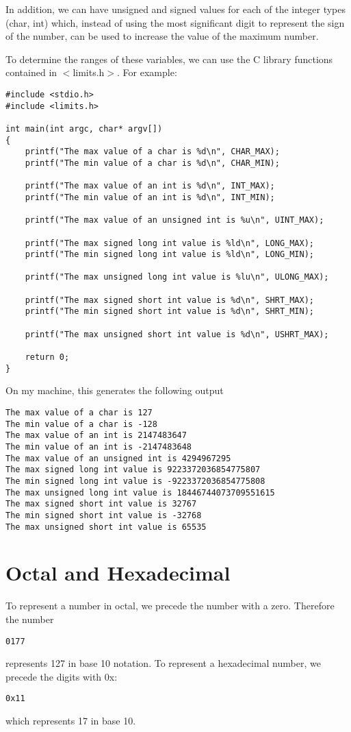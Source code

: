 In addition, we can have unsigned and signed values for each of the integer types (char, int) which, instead of using the most significant digit to represent the sign of the number, can be used to increase the value of the maximum number. 

To determine the ranges of these variables, we can use the C library functions contained in $<$limits.h$>$. For example:
\begin{verbatim}
#include <stdio.h>
#include <limits.h>

int main(int argc, char* argv[])
{
	printf("The max value of a char is %d\n", CHAR_MAX);
	printf("The min value of a char is %d\n", CHAR_MIN);
	
	printf("The max value of an int is %d\n", INT_MAX);
	printf("The min value of an int is %d\n", INT_MIN);
	
	printf("The max value of an unsigned int is %u\n", UINT_MAX);
	
	printf("The max signed long int value is %ld\n", LONG_MAX);
	printf("The min signed long int value is %ld\n", LONG_MIN);
	
	printf("The max unsigned long int value is %lu\n", ULONG_MAX);
	
	printf("The max signed short int value is %d\n", SHRT_MAX);
	printf("The min signed short int value is %d\n", SHRT_MIN);
	
	printf("The max unsigned short int value is %d\n", USHRT_MAX);
	
	return 0;
}
\end{verbatim}

On my machine, this generates the following output
\begin{verbatim}
The max value of a char is 127
The min value of a char is -128
The max value of an int is 2147483647
The min value of an int is -2147483648
The max value of an unsigned int is 4294967295
The max signed long int value is 9223372036854775807
The min signed long int value is -9223372036854775808
The max unsigned long int value is 18446744073709551615
The max signed short int value is 32767
The min signed short int value is -32768
The max unsigned short int value is 65535
\end{verbatim}



\section{Octal and Hexadecimal}

To represent a number in octal, we precede the number with a zero. Therefore the number 
\begin{verbatim}
0177
\end{verbatim}
represents 127 in base 10 notation. To represent a hexadecimal number, we precede the digits with 0x:
\begin{verbatim}
0x11
\end{verbatim}
which represents 17 in base 10.

